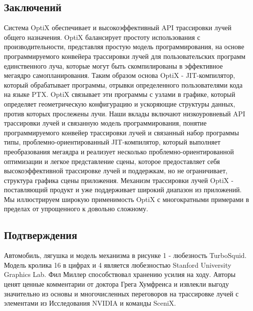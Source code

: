  \subsection{Заключений}
Система OptiX обеспечивает и высокоэффективный API трассировки лучей общего назначения. OptiX балансирует простоту использования с производительности, представляя простую модель программирования, на основе программируемого конвейера трассировки лучей для пользовательских программ единственного луча, которые могут быть скомпилированы в эффективное мегаядро самопланирования. Таким образом основа OptiX - JIT-компилятор, который обрабатывает программы,
отрывки определенного пользователями кода на языке PTX. OptiX связывает эти программы с узлами в графике, который определяет геометрическую конфигурацию и ускоряющие структуры данных, против которых прослежены лучи. Наши вклады включают низкоуровневый API трассировки лучей и связанную модель программирования, понятие программируемого
конвейер трассировки лучей и связанный набор программы типы, проблемно-ориентированный JIT-компилятор, который выполняет преобразования мегаядра и реализует несколько проблемно-ориентированной оптимизации и легкое представление сцены, которое предоставляет себя высокоэффективной трассировке лучей и поддержкам, но не ограничивает, структура графика сцены приложения. Механизм трассировки лучей OptiX - поставляющий продукт и уже поддерживает широкий диапазон
из приложений. Мы иллюстрируем широкую применимость OptiX с многократными примерами в пределах от упрощенного к довольно сложному. 
\subsection{Подтверждения}
Автомобиль, лягушка и модель механизма в рисунке 1 - любезность TurboSquid. Модель кролика 16 в цифрах и 4 является любезностью Stanford University Graphics Lab. Фил Миллер способствовал хранению усилия на ходу. Авторы ценят ценные комментарии от доктора Грега Хумфреиса и извлекли выгоду значительно из основы и многочисленных переговоров на трассировке лучей с элементами из Исследования NVIDIA и команды SceniX.
